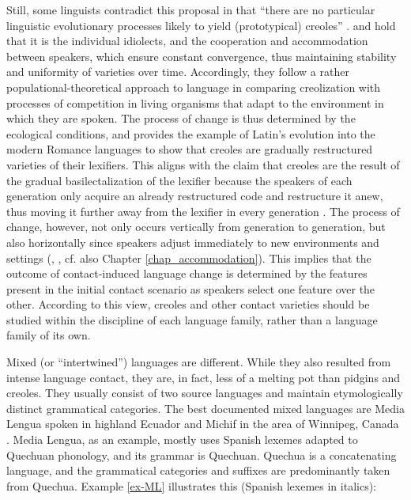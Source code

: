 \documentclass[output=paper]{langscibook}
\begin{document}
Still, some linguists contradict this proposal in that “there are no particular linguistic evolutionary processes likely to yield (prototypical) creoles” \citep[63]{mufwene2000creolization}. \citet{mufwene2001ecology} and \citet[80]{mufweneetal2017} hold that it is the individual idiolects, and the cooperation and accommodation between speakers, which ensure constant convergence, thus maintaining stability and uniformity of varieties over time. Accordingly, they follow a rather populational-theoretical approach to language \citep[following][]{croft_explaining_2000} in comparing creolization with processes of competition in living organisms that adapt to the environment in which they are spoken. The process of change is thus determined by the ecological conditions, and \citet{mufwene_colonization_2008} provides the example of Latin’s evolution into the modern Romance languages to show that creoles are gradually restructured varieties of their lexifiers. This aligns with the claim that creoles are the result of the gradual basilectalization of the lexifier because the speakers of each generation only acquire an already restructured code and restructure it anew, thus moving it further away from the lexifier in every generation \citep[cf.][]{chaudenson2001creolization}. The process of change, however, not only occurs vertically from generation to generation, but also horizontally since speakers adjust immediately to new environments and settings (\citealt[19]{mufwene_colonization_2008}, \citealt{clements2018speech}, cf. also Chapter \ref{chap_accommodation}). This implies that the outcome of contact-induced language change is determined by the features present in the initial contact scenario as speakers select one feature over the other. According to this view, creoles and other contact varieties should be studied within the discipline of each language family, rather than a language family of its own.

Mixed (or “intertwined”) languages are different. While they also resulted from intense language contact, they are, in fact, less of a melting pot than pidgins and creoles. They usually consist of two source languages and maintain etymologically distinct grammatical categories. The best documented mixed languages are Media Lengua spoken in highland Ecuador and Michif in the area of Winnipeg, Canada \citep{bakker1997language,muysken1997media}. Media Lengua, as an example,  mostly uses Spanish lexemes adapted to Quechuan phonology, and its grammar is Quechuan. Quechua is a concatenating language, and the grammatical categories and suffixes are predominantly taken from Quechua. Example \ref{ex-ML} illustrates this (Spanish lexemes in italics):
\end{document}
